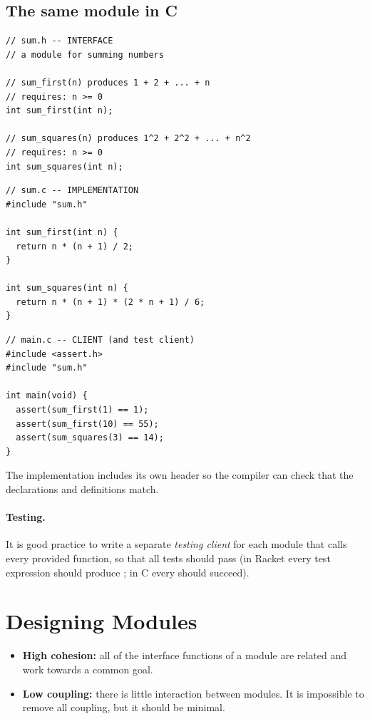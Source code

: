 \subsection{The same module in C}

\begin{lstlisting}[style=c]
// sum.h -- INTERFACE
// a module for summing numbers

// sum_first(n) produces 1 + 2 + ... + n
// requires: n >= 0
int sum_first(int n);

// sum_squares(n) produces 1^2 + 2^2 + ... + n^2
// requires: n >= 0
int sum_squares(int n);
\end{lstlisting}
\begin{lstlisting}[style=c]
// sum.c -- IMPLEMENTATION
#include "sum.h"

int sum_first(int n) {
  return n * (n + 1) / 2;
}

int sum_squares(int n) {
  return n * (n + 1) * (2 * n + 1) / 6;
}
\end{lstlisting}
\begin{lstlisting}[style=c]
// main.c -- CLIENT (and test client)
#include <assert.h>
#include "sum.h"

int main(void) {
  assert(sum_first(1) == 1);
  assert(sum_first(10) == 55);
  assert(sum_squares(3) == 14);
}
\end{lstlisting}
The implementation includes its own header so the compiler can check that the declarations
and definitions match.

\paragraph{Testing.} It is good practice to write a separate \emph{testing client} for each
module that calls every provided function, so that all tests should pass (in Racket every test
expression should produce ; in C every  should succeed).

\section{Designing Modules}

\begin{important}
\begin{itemize}
  \item \textbf{High cohesion:} all of the interface functions of a module are related and work
    towards a common goal.
  \item \textbf{Low coupling:} there is little interaction between modules. It is impossible to
    remove all coupling, but it should be minimal.
\end{itemize}
\end{important}

